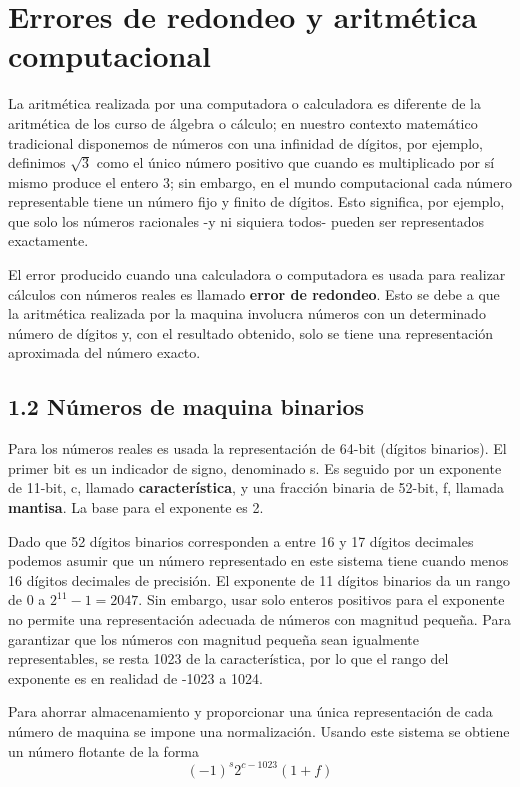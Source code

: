 \section*{Errores de redondeo y aritmética computacional} %

La aritmética realizada por una computadora o calculadora es diferente de la aritmética de los curso de álgebra o cálculo; en nuestro contexto matemático tradicional disponemos de números con una infinidad de dígitos, por ejemplo, definimos $\sqrt{3}$ como el único número positivo que cuando es multiplicado por sí mismo produce el entero $3$; sin embargo, en el mundo computacional cada número representable tiene un número fijo y finito de dígitos. Esto significa, por ejemplo, que solo los números racionales -y ni siquiera todos- pueden ser representados exactamente.

El error producido cuando una calculadora o computadora es usada para realizar cálculos con números reales es llamado \textbf{error de redondeo}. Esto se debe a que la aritmética realizada por la maquina involucra números con un determinado número de dígitos y, con el resultado obtenido, solo se tiene una representación aproximada del número exacto.

\subsection*{1.2 Números de maquina binarios}
Para los números reales es usada la representación de 64-bit (dígitos binarios). El primer bit es un indicador de signo, denominado s. Es seguido por un exponente de 11-bit, c, llamado \textbf{característica}, y una fracción binaria de 52-bit, f, llamada \textbf{mantisa}. La base para el exponente es 2.

Dado que 52 dígitos binarios corresponden a entre 16 y 17 dígitos decimales podemos asumir que un número representado en este sistema tiene cuando menos 16 dígitos decimales de precisión. El exponente de 11 dígitos binarios da un rango de 0 a $2^{11}-1=2047$. Sin embargo, usar solo enteros positivos para el exponente no permite una representación adecuada de números con magnitud pequeña. Para garantizar que los números con magnitud pequeña sean igualmente representables, se resta 1023 de la característica, por lo que el rango del exponente es en realidad de -1023 a 1024.

Para ahorrar almacenamiento y proporcionar una única representación de cada número de maquina se impone una normalización. Usando este sistema se obtiene un número flotante de la forma 
\begin{equation*} 
(-1)^{s}2^{c-1023}(1+f) 
\end{equation*}

